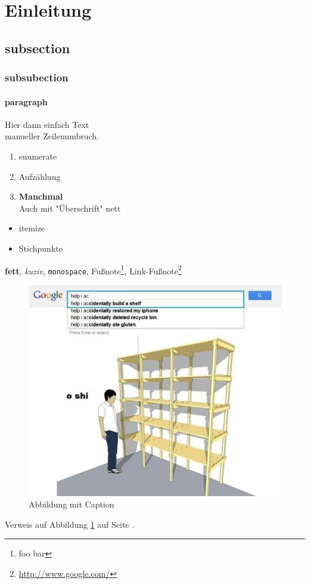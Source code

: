 \clearpage
{}
\section{Einleitung}
\subsection{subsection}
\subsubsection{subsubection}
\paragraph{paragraph}
Hier dann einfach Text\\
manueller Zeilenumbruch.
\begin{enumerate}
	\item enumerate
	\item Aufzählung
	\item \textbf{Manchmal}\\
	Auch mit "Überschrift" nett
\end{enumerate}
\begin{itemize}
	\item itemize
	\item Stichpunkte
\end{itemize}
\textbf{fett}, \emph{kuziv}, \texttt{monospace}, Fußnote\footnote{foo bar}, Link-Fußnote\footnote{\url{http://www.google.com/}}
\begin{figure}[htb]
\centering
\includegraphics[width=\textwidth]{foo.png}
\caption{Abbildung mit Caption}
\label{fig:foo_00}
\end{figure}
Verweis auf Abbildung \ref{fig:foo_00} auf Seite \pageref{fig:foo_00}.
